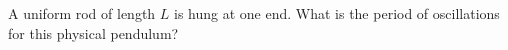 A uniform rod of length $L$ is hung at one end. What is the period of
oscillations for this physical pendulum?\answercheck
